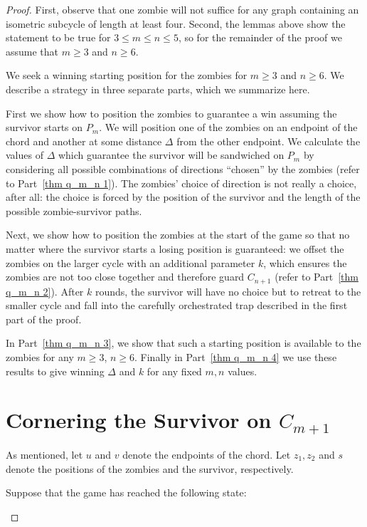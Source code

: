 \begin{proof}
  First, observe that one zombie will not suffice for any graph containing an isometric subcycle of length at least four.
  Second, the lemmas above show the statement to be true for $3\leq m \leq n \leq 5$, so for the remainder of the proof we assume that $m \geq 3$ and $n \geq 6$.

  We seek a winning starting position for the zombies for $m \geq 3$ and $n \geq 6$.
  We describe a strategy in three separate parts, which we summarize here.

  First we show how to position the zombies to guarantee a win assuming the survivor starts on $P_m$.
  We will position one of the zombies on an endpoint of the chord and another at some distance  $\Delta$ from the other endpoint. We calculate the values of $\Delta$ which guarantee the survivor will be sandwiched on $P_m$ by considering all possible combinations of directions ``chosen'' by the zombies (refer to Part~\ref{thm q_m_n 1}). The zombies' choice of direction is not really a choice, after all: the choice is forced by the position of the survivor and the length of the possible zombie-survivor paths.

  Next, we show how to position the zombies at the start of the game so that
  no matter where the survivor starts a losing position is guaranteed:
  we offset the zombies on the larger cycle with an additional parameter $k$, which ensures the zombies are not too close together and therefore guard $C_{n+1}$ (refer to Part~\ref{thm q_m_n 2}). After $k$ rounds, the survivor will have no choice but to retreat to the smaller cycle and fall into the carefully   orchestrated trap described in the first part of the proof.

  In Part~\ref{thm q_m_n 3}, we show that such a starting position is available to the zombies
  for any $m \geq 3$, $n \geq 6$. Finally in Part~\ref{thm q_m_n 4} we use these results to give winning $\Delta$ and $k$ for any fixed $m,n$ values.

  \section{Cornering the Survivor on $C_{m+1}$\label{thm q_m_n 1}}

As mentioned, let $u$ and $v$ denote the endpoints of the chord. Let $z_1, z_2$ and $s$ denote the positions of the zombies and the survivor, respectively.
\begin{proofpart}
   Suppose that the game has reached the following state:


\end{proofpart}
\end{proof}
